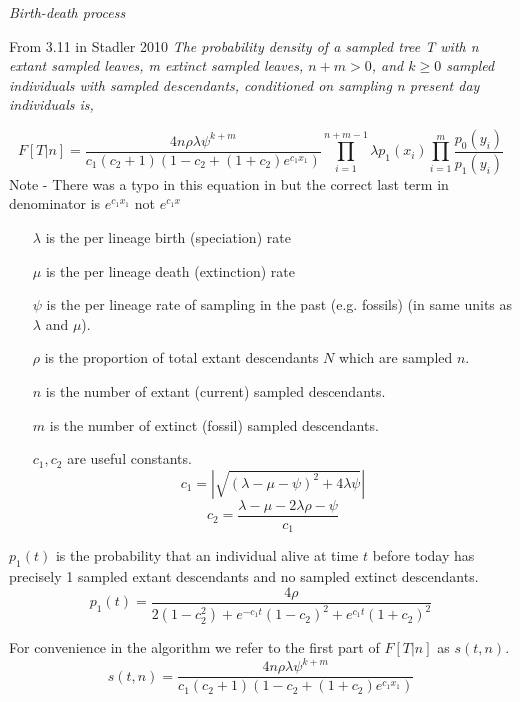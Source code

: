 \documentclass[12pt,letterpaper]{article}
\renewcommand{\subsection}[1]{%
\bigskip
\begin{center}
\begin{large}
\normalfont\itshape #1
\end{large}
\end{center}}
\begin{document}
\subsection{Birth-death process}
From 3.11 in Stadler 2010 \textit{The probability density of a sampled tree T with n
extant sampled leaves, m extinct sampled leaves, $n+m > 0$, and $k \geq 0$
sampled individuals with sampled descendants, conditioned on
sampling n present day individuals is,}

$$F[T|n] = \frac{4n\rho\lambda\psi^{k+m}}{c_1(c_2+1)(1-c_2+(1+c_2)e^{c_1x_1})}\prod_{i=1}^{n+m-1}\lambda p_1(x_i)\prod_{i=1}^{m}\frac{p_0(y_i)}{p_1(y_i)}$$
Note - There was a typo in this equation in \cite{Stadler2010} but the correct last term in denominator is $e^{c_1x_1}$ not  $e^{c_1x}$ \\

\begin{enumerate}
\item[$\lambda$]  is the per lineage birth (speciation) rate
\item[$\mu$]  is the per lineage death (extinction) rate
\item[$\psi$]  is the per lineage rate of sampling in the past (e.g. fossils) (in same units as $\lambda$ and $\mu$).
\item[$\rho$ ] is the proportion of total extant descendants $N$ which are sampled $n$.
\item[$n$] is the number of extant (current) sampled descendants.
\item[$m$] is the number of extinct (fossil) sampled descendants.
\item[$c_1,c_2$]  are useful constants.
$$c_1 = |\sqrt{(\lambda-\mu-\psi)^2 + 4\lambda\psi}|$$
$$c_2 = \frac{\lambda-\mu-2\lambda\rho-\psi}{c_1}$$
\end{enumerate}

$p_1(t)$ is the probability that an individual alive at time $t$ before today has precisely 1 sampled extant descendants and no sampled extinct descendants.
$${p_1}(t) = \frac{4\rho}{2(1-c_2^2)+e^{-c_1t}(1-c_2)^2+e^{c_1t}(1+c_2)^2}$$

For convenience in the algorithm we refer to the first part of $F[T|n]$ as $s(t,n)$.
$$s(t,n) = \frac{4n\rho\lambda\psi^{k+m}}{c_1(c_2+1)(1-c_2+(1+c_2)e^{c_1x_1})}$$
\end{document}
